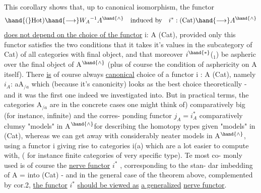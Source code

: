 This corollary shows that, up to canonical isomorphism, the
functor
\[ \hand{(}\mathrm{Hot}) \hand{\ensuremath{\longrightarrow}} W_A{}^{-1}A^{\hand{\wedge}} \quad \text{induced by} \quad i^* : (\mathrm{Cat}) \hand{\ensuremath{\longrightarrow}} A^{\hand{\wedge}} \]
\uline{does not depend on the choice of the functor} i: A \hand{\ensuremath{\to}}(Cat), provided
only this functor satisfies the two conditions that  it takes it's
values in the  subcategory of \hand{(}Cat) of all categories with final object,
and that moreover $i^{\hand{*}}$(\hand{\ensuremath{\Delta}}$_1$) be aspheric over the final object of A$^{\hand{\wedge}}$ (plus
of course the condition of asphericity on A itself). There \uline{is} of course
always   \uline{canonical} choice of a functor i : A \hand{\ensuremath{\to}}(Cat), namely $i_A$: a\hand{\ensuremath{\mapsto}}A$_{/a}$\hand{,}
which (because  it's canonicity) looks as the best choice theoretically -
and it was the first one indeed we investigated into. But in practical
terms, the categories A$_{/a}$ are \hand{(}in  the concrete cases one might
think of) comparatively big  (for instance, infinite) and the corres-%
ponding functor $j_A = i_A^*$  comparatively clumsy "models" in A$^{\hand{\wedge}}$\hand{/}for describing
the homotopy types  given "models" in (Cat), whereas we
can get away with considerably neater models in A$^{\hand{\wedge}}$, using a functor
i giving rise to categories i(a) which are a lot easier to compute with,
( for instance\hand{,} finite categories of very specific type). Te most co-%
monly used is of course the \uline{nerve functor} $i^*$ , corresponding to the stan-%
dar imbedding of A =\hand{\ensuremath{\Delta}} into (Cat) - and in the general case of the
theorem above, complemented by cor.2, \uline{the functor} $i^*$ \uline{should be viewed as}
\uline{a generalized} \uline{nerve functor}.
